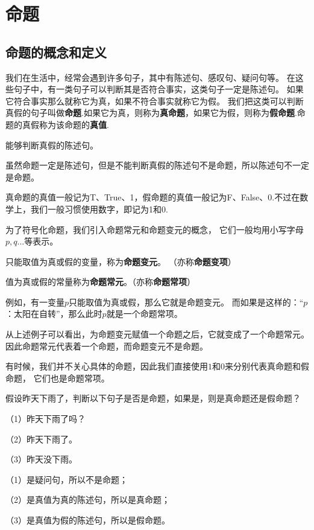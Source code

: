 \section{命题}
\subsection{命题的概念和定义}
我们在生活中，经常会遇到许多句子，其中有陈述句、感叹句、疑问句等。
在这些句子中，有一类句子可以判断其是否符合事实，这类句子一定是陈述句。
如果它符合事实那么就称它为真，如果不符合事实就称它为假。
我们把这类可以判断真假的句子叫做\textbf{命题}.如果它为真，则称为\textbf{真命题}，如果它为假，则称为\textbf{假命题}.命题的真假称为该命题的\textbf{真值}.

\begin{definition}[命题]
    能够判断真假的陈述句。
\end{definition}

虽然命题一定是陈述句，但是不能判断真假的陈述句不是命题，所以陈述句不一定是命题。

真命题的真值一般记为T、True、1，假命题的真值一般记为F、False、0.不过在数学上，我们一般习惯使用数字，即记为1和0.

为了符号化命题，我们引入命题常元和命题变元的概念，
它们一般均用小写字母$p,q...$等表示。

\begin{definition}
    只能取值为真或假的变量，称为\textbf{命题变元}。
    （亦称\textbf{命题变项}）
    
    值为真或假的常量称为\textbf{命题常元}。（亦称\textbf{命题常项}）
\end{definition}

例如，有一变量$p$只能取值为真或假，那么它就是命题变元。
而如果是这样的：“$p$：太阳在自转”，那么此时$p$就是一个命题常项。

从上述例子可以看出，为命题变元赋值一个命题之后，它就变成了一个命题常元。
因此命题常元代表着一个命题，而命题变元不是命题。

有时候，我们并不关心具体的命题，因此我们直接使用$1$和$0$来分别代表真命题和假命题，
它们也是命题常项。

\begin{example}
    假设昨天下雨了，判断以下句子是否是命题，如果是，则是真命题还是假命题？

    （1）昨天下雨了吗？

    （2）昨天下雨了。
    
    （3）昨天没下雨。
\end{example}
\begin{solution}
    （1）是疑问句，所以不是命题；
    
    （2）是真值为真的陈述句，所以是真命题；

    （3）是真值为假的陈述句，所以是假命题。
\end{solution}

